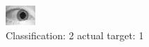 \begin{figure}[h!]
\begin{center}
\includegraphics[width=0.60\columnwidth]{figures/ID1505_class_2_target_1.png}
\end{center}
\caption{ Classification: 2 actual target: 1}
\label{fig:ID1505_class_2_target_1}
\end{figure}
